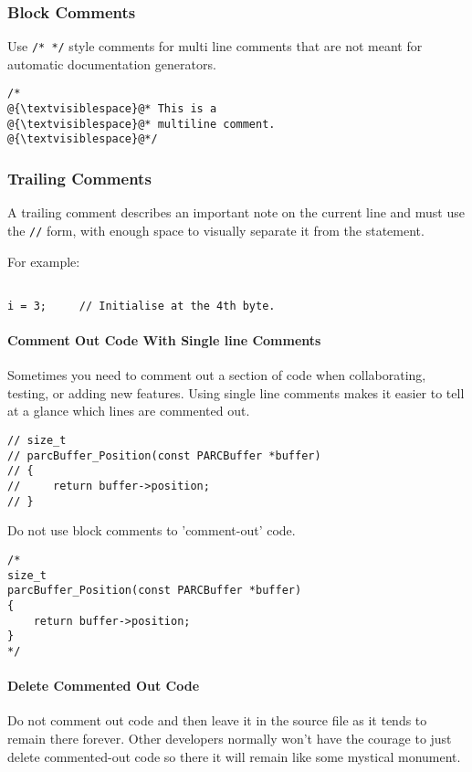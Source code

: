 \documentclass[fleqn,12pt]{PARCOneColumn} %
\begin{document}
\subsubsection{Block Comments}
Use {\tt /* */} style comments for multi line comments that are not meant for automatic documentation generators.

\begin{lstlisting}
/*
@{\textvisiblespace}@* This is a
@{\textvisiblespace}@* multiline comment.
@{\textvisiblespace}@*/
\end{lstlisting}

\subsubsection{Trailing Comments}
A trailing comment describes an important note on the current line and must use the {\tt //} form,
with enough space to visually separate it from the statement.

For example:
\begin{lstlisting}

i = 3;     // Initialise at the 4th byte.

\end{lstlisting}

\paragraph{Comment Out Code With Single line Comments}
Sometimes you need to comment out a section of code when collaborating,
testing, or adding new features.
Using single line comments makes it easier to tell at a glance which lines are commented out.

\begin{lstlisting}
// size_t
// parcBuffer_Position(const PARCBuffer *buffer)
// {
//     return buffer->position;
// }
\end{lstlisting}

Do not use block comments to 'comment-out' code.

\begin{lstlisting}[backgroundcolor=\color{badCodeColor}]
/*
size_t
parcBuffer_Position(const PARCBuffer *buffer)
{
    return buffer->position;
}
*/
\end{lstlisting}

\paragraph{Delete Commented Out Code}
Do not comment out code and then leave it in the source file as it tends to remain there forever.
Other developers normally won't have the courage to just delete commented-out code so
there it will remain like some mystical monument.
\end{document}
